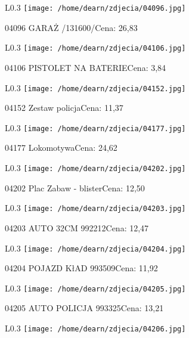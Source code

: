 \begin{wrapfigure}{L}{0.3\textwidth}
\texttt{[image: /home/dearn/zdjecia/04096.jpg]}
\end{wrapfigure}
04096 GARAŻ /131600/Cena: 26,83\newline
\begin{wrapfigure}{L}{0.3\textwidth}
\texttt{[image: /home/dearn/zdjecia/04106.jpg]}
\end{wrapfigure}
04106 PISTOLET NA BATERIECena: 3,84\newline
\begin{wrapfigure}{L}{0.3\textwidth}
\texttt{[image: /home/dearn/zdjecia/04152.jpg]}
\end{wrapfigure}
04152 Zestaw policjaCena: 11,37\newline
\begin{wrapfigure}{L}{0.3\textwidth}
\texttt{[image: /home/dearn/zdjecia/04177.jpg]}
\end{wrapfigure}
04177 LokomotywaCena: 24,62\newline
\begin{wrapfigure}{L}{0.3\textwidth}
\texttt{[image: /home/dearn/zdjecia/04202.jpg]}
\end{wrapfigure}
04202 Plac Zabaw - blisterCena: 12,50\newline
\begin{wrapfigure}{L}{0.3\textwidth}
\texttt{[image: /home/dearn/zdjecia/04203.jpg]}
\end{wrapfigure}
04203 AUTO 32CM                                       992212Cena: 12,47\newline
\begin{wrapfigure}{L}{0.3\textwidth}
\texttt{[image: /home/dearn/zdjecia/04204.jpg]}
\end{wrapfigure}
04204 POJAZD KłAD                                     993509Cena: 11,92\newline
\begin{wrapfigure}{L}{0.3\textwidth}
\texttt{[image: /home/dearn/zdjecia/04205.jpg]}
\end{wrapfigure}
04205 AUTO POLICJA                                    993325Cena: 13,21\newline
\begin{wrapfigure}{L}{0.3\textwidth}
\texttt{[image: /home/dearn/zdjecia/04206.jpg]}
\end{wrapfigure}
